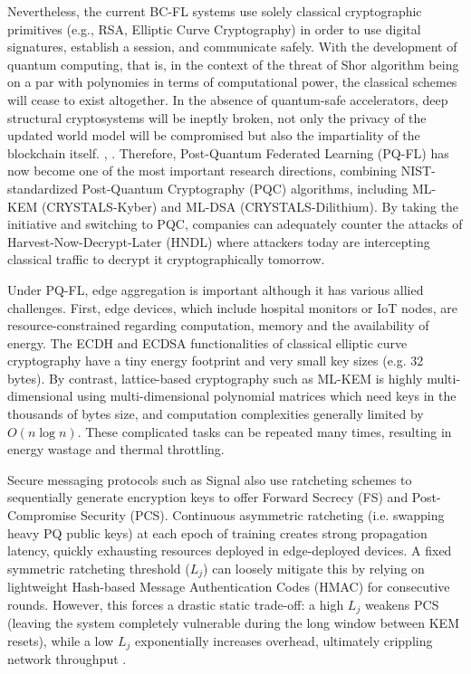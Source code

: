 \documentclass[journal, 10pt, twocolumn]{IEEEtran}
\begin{document}
Nevertheless, the current BC-FL systems use solely classical cryptographic primitives (e.g., RSA, Elliptic Curve Cryptography) in order to use digital signatures, establish a session, and communicate safely. With the development of quantum computing, that is, in the context of the threat of Shor algorithm being on a par with polynomies in terms of computational power, the classical schemes will cease to exist altogether. In the absence of quantum-safe accelerators, deep structural cryptosystems will be ineptly broken, not only the privacy of the updated world model will be compromised but also the impartiality of the blockchain itself.
\cite{pqflmdpi}, \cite{beskar}. Therefore, Post-Quantum Federated Learning (PQ-FL) has now become one of the most important research directions, combining NIST-standardized Post-Quantum Cryptography (PQC) algorithms, including ML-KEM (CRYSTALS-Kyber) and ML-DSA (CRYSTALS-Dilithium). By taking the initiative and switching to PQC, companies can adequately counter the attacks of Harvest-Now-Decrypt-Later (HNDL) where attackers today are intercepting classical traffic to decrypt it cryptographically tomorrow.

Under PQ-FL, edge aggregation is important although it has various allied challenges. First, edge devices, which include hospital monitors or IoT nodes, are resource-constrained regarding computation, memory and the availability of energy. The ECDH and ECDSA functionalities of classical elliptic curve cryptography have a tiny energy footprint and very small key sizes (e.g. 32 bytes). By contrast, lattice-based cryptography such as ML-KEM is highly multi-dimensional using multi-dimensional polynomial matrices which need keys in the thousands of bytes size, and computation complexities generally limited by $O(n \log n)$. These complicated tasks can be repeated many times, resulting in energy wastage and thermal throttling.

Secure messaging protocols such as Signal also use ratcheting schemes to sequentially generate encryption keys to offer Forward Secrecy (FS) and Post-Compromise Security (PCS). Continuous asymmetric ratcheting (i.e. swapping heavy PQ public keys) at each epoch of training creates strong propagation latency, quickly exhausting resources deployed in edge-deployed devices. A fixed symmetric ratcheting threshold ($L_j$) can loosely mitigate this by relying on lightweight Hash-based Message Authentication Codes (HMAC) for consecutive rounds. However, this forces a drastic static trade-off: a high $L_j$ weakens PCS (leaving the system completely vulnerable during the long window between KEM resets), while a low $L_j$ exponentially increases overhead, ultimately crippling network throughput \cite{pqbfl1}.
\end{document}
